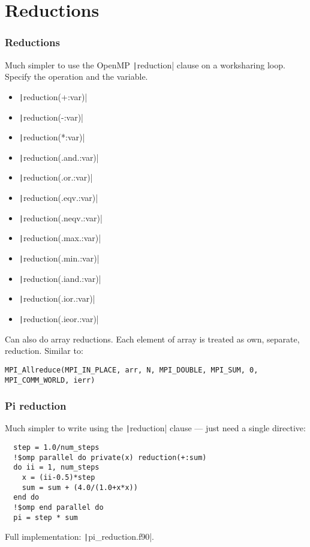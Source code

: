 \documentclass{beamer}
\begin{document}
\section{Reductions}
\begin{frame}[fragile]
\frametitle{Reductions}
Much simpler to use the OpenMP \texttt|reduction| clause on a worksharing loop.
Specify the operation and the variable.
\begin{multicols}{2}
\begin{itemize}
  \item \texttt|reduction(+:var)|
  \item \texttt|reduction(-:var)|
  \item \texttt|reduction(*:var)|
  \item \texttt|reduction(.and.:var)|
  \item \texttt|reduction(.or.:var)|
  \item \texttt|reduction(.eqv.:var)|
  \item \texttt|reduction(.neqv.:var)|
  \item \texttt|reduction(.max.:var)|
  \item \texttt|reduction(.min.:var)|
  \item \texttt|reduction(.iand.:var)|
  \item \texttt|reduction(.ior.:var)|
  \item \texttt|reduction(.ieor.:var)|
\end{itemize}
\end{multicols}

Can also do array reductions. Each element of array is treated as own, separate, reduction.
Similar to:
\begin{verbatim}
MPI_Allreduce(MPI_IN_PLACE, arr, N, MPI_DOUBLE, MPI_SUM, 0, MPI_COMM_WORLD, ierr)
\end{verbatim}

\end{frame}

\begin{frame}[fragile]
\frametitle{Pi reduction}
Much simpler to write using the \texttt|reduction| clause --- just need a single directive:
\begin{verbatim}
  step = 1.0/num_steps
  !$omp parallel do private(x) reduction(+:sum)
  do ii = 1, num_steps
    x = (ii-0.5)*step
    sum = sum + (4.0/(1.0+x*x))
  end do
  !$omp end parallel do
  pi = step * sum
\end{verbatim}

Full implementation: \texttt|pi_reduction.f90|.
\end{frame}
\end{document}
